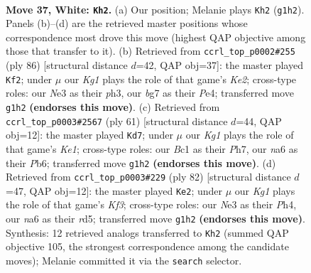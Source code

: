 \documentclass[11pt]{article}
\begin{document}
\clearpage

\begin{figure}[p]\centering
\begin{subfigure}{0.46\textwidth}\centering
\resizebox{\linewidth}{!}{%
\newchessgame
\chessboard[
  setfen={1r5k/1P4b1/n7/R7/2P5/4N1n1/8/1RB3K1 w - - 1 37},
  showmover=false,
  pgfstyle=straightmove, color=movearrow, markmove={g1-h2}
]}
\caption{}
\end{subfigure}\hfill
\begin{subfigure}{0.46\textwidth}\centering
\resizebox{\linewidth}{!}{%
\newchessgame
\chessboard[
  setfen={8/r3k3/B1n1p3/1PP3p1/R3P3/7p/4K3/8 w - - 0 44},
  showmover=false,
  pgfstyle=straightmove, color=movearrow, markmove={e2-f2}
]}
\caption{}
\end{subfigure}
\\[4pt]
\begin{subfigure}{0.46\textwidth}\centering
\resizebox{\linewidth}{!}{%
\newchessgame
\chessboard[
  setfen={4k3/7p/1pN1p3/1p6/3KR3/7r/P7/8 b - - 3 31},
  showmover=false,
  pgfstyle=straightmove, color=movearrow, markmove={e8-d7}
]}
\caption{}
\end{subfigure}\hfill
\begin{subfigure}{0.46\textwidth}\centering
\resizebox{\linewidth}{!}{%
\newchessgame
\chessboard[
  setfen={8/6p1/p4n2/3r1k2/P2R3P/4BK2/8/8 w - - 7 42},
  showmover=false,
  pgfstyle=straightmove, color=movearrow, markmove={f3-e2}
]}
\caption{}
\end{subfigure}
\caption{\textbf{Move 37, White: \texttt{Kh2}.} (a) Our position; Melanie plays \texttt{Kh2} (\texttt{g1h2}). Panels (b)--(d) are the retrieved master positions whose correspondence most drove this move (highest QAP objective among those that transfer to it). (b) Retrieved from \texttt{ccrl\_top\_p0002\#255} (ply 86) [structural distance $d$=42, QAP obj=37]: the master played \texttt{Kf2}; under $\mu$ our \emph{Kg1} plays the role of that game's \emph{Ke2}; cross-type roles: our \emph{N}e3 as their \emph{p}h3, our \emph{b}g7 as their \emph{P}e4; transferred move \texttt{g1h2} \textbf{(endorses this move)}. (c) Retrieved from \texttt{ccrl\_top\_p0003\#2567} (ply 61) [structural distance $d$=44, QAP obj=12]: the master played \texttt{Kd7}; under $\mu$ our \emph{Kg1} plays the role of that game's \emph{Ke1}; cross-type roles: our \emph{B}c1 as their \emph{P}h7, our \emph{n}a6 as their \emph{P}b6; transferred move \texttt{g1h2} \textbf{(endorses this move)}. (d) Retrieved from \texttt{ccrl\_top\_p0003\#229} (ply 82) [structural distance $d$=47, QAP obj=12]: the master played \texttt{Ke2}; under $\mu$ our \emph{Kg1} plays the role of that game's \emph{Kf3}; cross-type roles: our \emph{N}e3 as their \emph{P}h4, our \emph{n}a6 as their \emph{r}d5; transferred move \texttt{g1h2} \textbf{(endorses this move)}. Synthesis: 12 retrieved analogs transferred to \texttt{Kh2} (summed QAP objective 105, the strongest correspondence among the candidate moves); Melanie committed it via the \texttt{search} selector.}
\label{fig:thought-m72}
\end{figure}
\end{document}
